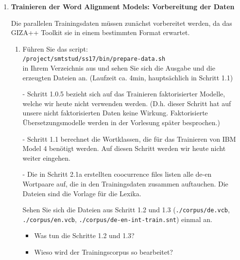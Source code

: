 \documentclass[12pt,fleqn]{article}
\begin{document}
\vspace{0.5cm} 
\begin{enumerate}

\item \textbf{Trainieren der Word Alignment Models: Vorbereitung der Daten} 

\vspace{0.5cm} 
Die parallelen Trainingsdaten müssen zunächst vorbereitet werden, da das GIZA++ Toolkit sie in einem bestimmten Format erwartet.

\vspace{0.5cm} 
\begin{enumerate} 
\item Führen Sie das script:  \\
\texttt{/project/smtstud/ss17/bin/prepare-data.sh} \\ 
in Ihrem Verzeichnis aus und sehen Sie sich die Ausgabe und die erzeugten Dateien an.
(Laufzeit ca. 4min, hauptsächlich in Schritt 1.1)

\vspace{0.5cm} 
- Schritt 1.0.5 bezieht sich auf das Trainieren faktorisierter Modelle, welche wir heute nicht verwenden werden. (D.h. dieser Schritt hat auf unsere nicht faktorisierten Daten keine Wirkung. Faktorisierte Übersetzungsmodelle werden in der Vorlesung später besprochen.)

\vspace{0.5cm} 
- Schritt 1.1 berechnet die Wortklassen, die für das Trainieren von IBM Model 4 benötigt werden. Auf diesen Schritt werden wir heute nicht weiter eingehen.

\vspace{0.5cm} 
- Die in Schritt 2.1a erstellten coocurrence files listen alle de-en Wortpaare auf, die in den Trainingsdaten zusammen auftauchen. Die Dateien sind die Vorlage für die Lexika.

\vspace{0.5cm} 
Sehen Sie sich die Dateien aus Schritt 1.2 und 1.3 (\texttt{./corpus/de.vcb}, \texttt{./corpus/en.vcb}, \texttt{./corpus/de-en-int-train.snt}) einmal an.


\vspace{0.5cm} 
\begin{itemize} 
\item Was tun die Schritte 1.2 und 1.3?
\item Wieso wird der Trainingscorpus so bearbeitet?
\end{itemize} 


\end{enumerate} 


\end{enumerate}
\end{document}
